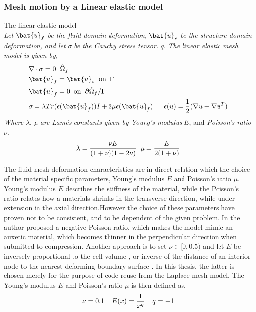 \subsubsection*{Mesh motion by a Linear elastic model}
\begin{equat}
The linear elastic model \\ \textit{Let} $\bat{u}_f$ \textit{be the fluid domain deformation,} $\bat{u}_s$ \textit{be the structure domain deformation, and let} $\sigma$ \textit{be the Cauchy stress tensor.} $q$. \textit{The linear elastic mesh model is given by, }   
\begin{align*}
&\nabla \cdot \sigma = 0 \hspace{2mm} \hat{\Omega}_f\\
&\bat{u}_f = \bat{u}_s \hspace{2mm} \text{on} \hspace{2mm}  \Gamma \\
&\bat{u}_f = 0 \hspace{2mm} \text{on} \hspace{2mm} \partial \hat{\Omega}_f / \Gamma \\
&\sigma = \lambda Tr(\epsilon(\bat{u}_f)) I + 2 \mu \epsilon(\bat{u}_f) \hspace{2mm}
&\epsilon(u) = \frac{1}{2}(\nabla u + \nabla  u^T)
\end{align*}
\textit{Where} $\lambda$, $\mu$ \textit{are Lamés constants given by Young's modulus}  $E$, and \textit{Poisson's  ratio } $\nu$.
\begin{align*}
\lambda = \frac{\nu E}{(1 + \nu)(1 - 2\nu)} \hspace{2mm} \mu = \frac{E}{2(1 + \nu)}
\end{align*}
\end{equat}
The fluid mesh deformation characteristics are in direct relation which the choice of the material specific parameters, Young's modulus $E$ and Poisson's ratio $\mu$.  Young's modulus $E$ describes the stiffness of the material, while the Poisson's ratio relates how a materials shrinks in the transverse direction, while under extension in the axial direction.However the choice of these parameters have proven not to be consistent, and to be dependent of the given problem.
In \cite{Wicka} the author proposed a negative Poisson ratio, which makes the model mimic an auxetic material, which becomes thinner in the perpendicular direction when submitted to compression. Another approach is to set  $\nu \in [0, 0.5)$ and let $E$ be inversely proportional to the cell volume \cite{Biedron}, or inverse of the distance of an interior node to the nearest deforming boundary surface \cite{MM2016}. In this thesis, the latter is chosen merely for the purpose of code reuse from the Laplace mesh model. The Young's modulus $E$ and Poisson's  ratio $\mu$ is then  defined as,
\begin{align*}
\nu = 0.1 \hspace{4mm} E(x) = \frac{1}{x^q}  \hspace{4mm} q = -1
\end{align*}
